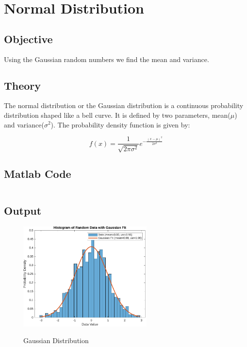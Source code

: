 \section{Normal Distribution}
\label{sec:Normal Distribution}

\subsection{Objective}
Using the Gaussian random numbers we find the mean and variance. 

\subsection{Theory}
The normal distribution or the Gaussian distribution is a continuous probability distribution 
shaped like a bell curve. It is defined by two parameters, mean($\mu$) and variance($\sigma^2$).
The probability density function is given by:

\begin{equation}
	f(x) = \frac{1}{\sqrt{2\pi\sigma^2}} e^{-\frac{(x-\mu)^2}{2\sigma^2}}
\end{equation}

\pagebreak
\subsection{Matlab Code}

\inputminted[fontsize=\footnotesize,autogobble]{matlab}{code/density.m}

\subsection{Output}

\begin{figure}[!htb]
	\centering
	\includegraphics[width=0.6\textwidth]{res/figures/Figure_2.pdf}
	\label{output:gaussian distribution}
	\caption{Gaussian Distribution}
\end{figure}
